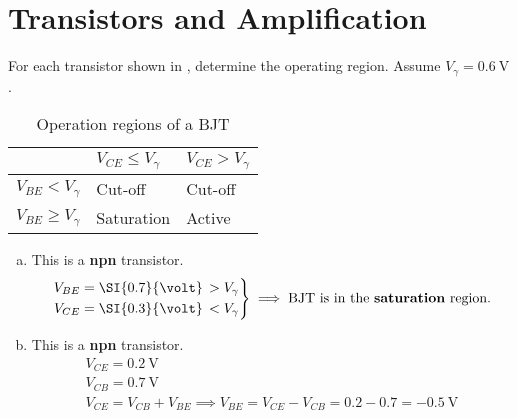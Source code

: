 \documentclass[10pt,a4paper]{memoir}
\begin{document}
\chapter{Transistors and Amplification}

\begin{question}
  For each transistor shown in , determine the operating region. Assume $V_{\gamma}=\SI{0.6}{\volt}$.
  \begin{figure}[!h]
    \centering
    \subfloat[]{\texttt{[image: t09-1a]}} \qquad\qquad
    \subfloat[]{\texttt{[image: t09-1b]}} \qquad\qquad
    \subfloat[]{\texttt{[image: t09-1c]}}
    \caption{}
    \label{fig:t09-1}
  \end{figure}
\end{question}
\begin{solution}
  \begin{table}[!h]
  \centering
  \begin{tabular}{l | l l}
    \toprule
     & $V_{CE} \leq V_{\gamma}$ & $V_{CE} > V_{\gamma}$ \\
    \midrule
    $V_{BE} < V_{\gamma}$     & Cut-off     & Cut-off \\
    $V_{BE} \geq V_{\gamma}$  & Saturation  & Active \\
    \bottomrule
  \end{tabular}
  \caption{Operation regions of a BJT}
  \end{table}
  \begin{enumerate}[(a)]
    \item This is a \textbf{npn} transistor.
      \begin{equation*}
        \left.
        \begin{aligned}
          V_{BE} = \SI{0.7}{\volt} \, &> V_{\gamma} \\
          V_{CE} = \SI{0.3}{\volt} \, &< V_{\gamma}
        \end{aligned} \right\rbrace \implies \mbox{BJT is in the \textbf{saturation} region.}
      \end{equation*}
    \item This is a \textbf{npn} transistor.
      \begin{gather*}
        V_{CE} = \SI{0.2}{\volt} \\
        V_{CB} = \SI{0.7}{\volt} \\
        V_{CE} = V_{CB} + V_{BE} \implies V_{BE} = V_{CE} - V_{CB} = 0.2 - 0.7 =  -\SI{0.5}{\volt} \\
        \left.

\end{gather*}
\end{enumerate}
\end{solution}
\end{document}
